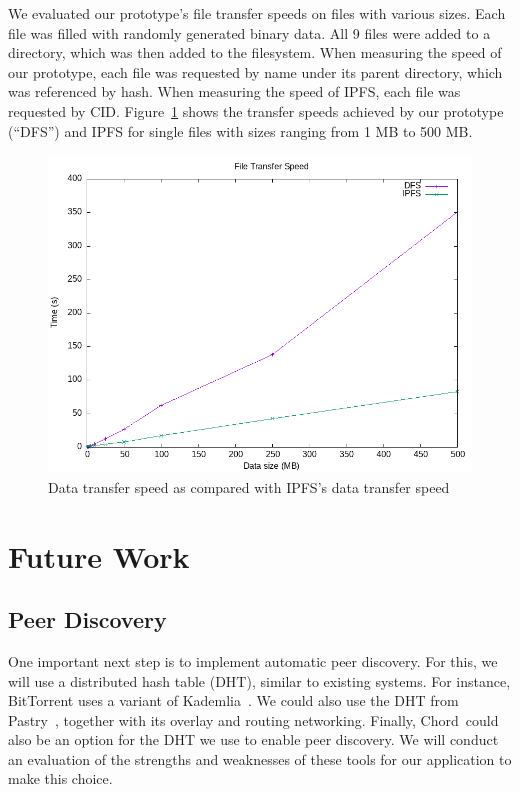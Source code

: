 \documentclass[twocolumn]{article}
\begin{document}
We evaluated our prototype's file transfer speeds on files with various sizes.
Each file was filled with randomly generated binary data.
All 9 files were added to a directory, which was then added to the filesystem.
When measuring the speed of our prototype, each file was requested by name under its parent directory, which was referenced by hash.
When measuring the speed of IPFS, each file was requested by CID.\@
Figure~\ref{fig:speed} shows the transfer speeds achieved by our prototype (``DFS'') and IPFS for single files with sizes ranging from 1 MB to 500 MB.\@

\begin{figure}\label{fig:speed}
	\caption{Data transfer speed as compared with IPFS's data transfer speed}

	\includegraphics[width=\columnwidth]{data/speed.png}
\end{figure}

\section{Future Work}

\subsection{Peer Discovery}

One important next step is to implement automatic peer discovery.
For this, we will use a distributed hash table (DHT), similar to existing systems.
For instance, BitTorrent uses a variant of Kademlia~\cite{maymounkov-2002}.
We could also use the DHT from Pastry~\cite{rowstron-2001}, together with its overlay and routing networking.
Finally, Chord~\cite{stoica-2001}could also be an option for the DHT we use to enable peer discovery.
We will conduct an evaluation of the strengths and weaknesses of these tools for our application to make this choice.
\end{document}
